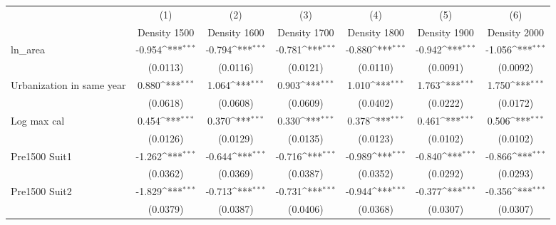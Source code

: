 {
\def\sym#1{\ifmmode^{#1}\else\(^{#1}\)\fi}
\begin{tabular}{l*{6}{c}}
\toprule
                    &\multicolumn{1}{c}{(1)}&\multicolumn{1}{c}{(2)}&\multicolumn{1}{c}{(3)}&\multicolumn{1}{c}{(4)}&\multicolumn{1}{c}{(5)}&\multicolumn{1}{c}{(6)}\\
                    &\multicolumn{1}{c}{Density 1500}&\multicolumn{1}{c}{Density 1600}&\multicolumn{1}{c}{Density 1700}&\multicolumn{1}{c}{Density 1800}&\multicolumn{1}{c}{Density 1900}&\multicolumn{1}{c}{Density 2000}\\
\midrule
ln\_area             &      -0.954\sym{***}&      -0.794\sym{***}&      -0.781\sym{***}&      -0.880\sym{***}&      -0.942\sym{***}&      -1.056\sym{***}\\
                    &    (0.0113)         &    (0.0116)         &    (0.0121)         &    (0.0110)         &    (0.0091)         &    (0.0092)         \\
\addlinespace
Urbanization in same year&       0.880\sym{***}&       1.064\sym{***}&       0.903\sym{***}&       1.010\sym{***}&       1.763\sym{***}&       1.750\sym{***}\\
                    &    (0.0618)         &    (0.0608)         &    (0.0609)         &    (0.0402)         &    (0.0222)         &    (0.0172)         \\
\addlinespace
Log max cal         &       0.454\sym{***}&       0.370\sym{***}&       0.330\sym{***}&       0.378\sym{***}&       0.461\sym{***}&       0.506\sym{***}\\
                    &    (0.0126)         &    (0.0129)         &    (0.0135)         &    (0.0123)         &    (0.0102)         &    (0.0102)         \\
\addlinespace
Pre1500 Suit1       &      -1.262\sym{***}&      -0.644\sym{***}&      -0.716\sym{***}&      -0.989\sym{***}&      -0.840\sym{***}&      -0.866\sym{***}\\
                    &    (0.0362)         &    (0.0369)         &    (0.0387)         &    (0.0352)         &    (0.0292)         &    (0.0293)         \\
\addlinespace
Pre1500 Suit2       &      -1.829\sym{***}&      -0.713\sym{***}&      -0.731\sym{***}&      -0.944\sym{***}&      -0.377\sym{***}&      -0.356\sym{***}\\
                    &    (0.0379)         &    (0.0387)         &    (0.0406)         &    (0.0368)         &    (0.0307)         &    (0.0307)         \\

\end{tabular}}
